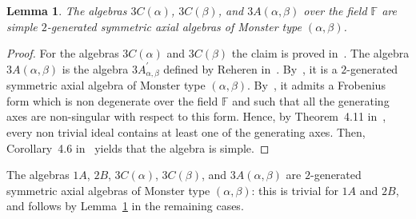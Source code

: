 \documentclass[a4paper]{amsart}
\newtheorem{lemma}{Lemma}[section]
\newcommand{\F}{{\mathbb F}}
\newcommand{\al}{\alpha}
\newcommand{\bt}{\beta}
\begin{document}
\begin{lemma}\label{simple}
The algebras $3C(\al)$, $3C(\bt)$, and  $3A(\al, \bt)$ over the field $\F$ are simple $2$-generated symmetric axial algebras of Monster type $(\al, \bt)$. 
\end{lemma}
\begin{proof}
For the algebras $3C(\al)$ and  $3C(\bt)$ the claim is proved in~\cite[Example~3.4]{HRS1}. 
  The algebra $3A(\al, \bt)$ is the algebra $3A^\prime_{\al, \bt}$ defined by Reheren in~\cite[Table~9]{R}. By~\cite[Theorem~8.1]{R}, it is a $2$-generated symmetric axial algebra of Monster type $(\al, \bt)$. By~\cite[Lemma~8.2]{R}, it admits a Frobenius form which is non degenerate over the field $\F$ and such that all the generating axes are non-singular with respect to this form. Hence, by Theorem~4.11 in~\cite{KMS}, every non trivial ideal contains at least one of the generating axes. Then, Corollary~4.6 in~\cite{KMS} yields that the algebra is simple.
\end{proof}



The algebras  $1A$, $2B$, $3C(\al)$, $3C(\bt)$, and $3A(\al, \bt)$ are $2$-generated symmetric axial algebras of Monster type $(\al, \bt)$: this is trivial for $1A$ and $2B$, and follows by Lemma~\ref{simple} in the remaining cases.
\end{document}
